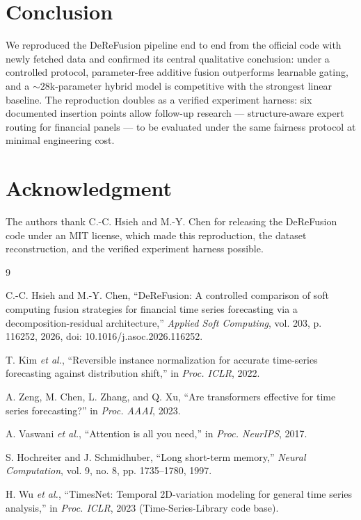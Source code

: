 \documentclass[conference]{IEEEtran}
\begin{document}
\section{Conclusion}
\label{sec:conclusion}

We reproduced the DeReFusion pipeline end to end from the official code
with newly fetched data and confirmed its central qualitative conclusion:
under a controlled protocol, parameter-free additive fusion outperforms
learnable gating, and a ${\sim}28$k-parameter hybrid model is competitive
with the strongest linear baseline. The reproduction doubles as a verified
experiment harness: six documented insertion points allow follow-up
research --- structure-aware expert routing for financial panels --- to be
evaluated under the same fairness protocol at minimal engineering cost.

\section*{Acknowledgment}

The authors thank C.-C. Hsieh and M.-Y. Chen for releasing the DeReFusion
code under an MIT license, which made this reproduction, the dataset
reconstruction, and the verified experiment harness possible.

\begin{thebibliography}{9}

C.-C. Hsieh and M.-Y. Chen,
``DeReFusion: A controlled comparison of soft computing fusion strategies
for financial time series forecasting via a decomposition-residual
architecture,'' \emph{Applied Soft Computing}, vol. 203, p. 116252, 2026,
doi: 10.1016/j.asoc.2026.116252.

T. Kim \emph{et al.}, ``Reversible instance normalization for accurate
time-series forecasting against distribution shift,'' in \emph{Proc. ICLR},
2022.

A. Zeng, M. Chen, L. Zhang, and Q. Xu, ``Are transformers effective for time
series forecasting?'' in \emph{Proc. AAAI}, 2023.

A. Vaswani \emph{et al.}, ``Attention is all you need,'' in \emph{Proc.
NeurIPS}, 2017.

S. Hochreiter and J. Schmidhuber, ``Long short-term memory,''
\emph{Neural Computation}, vol. 9, no. 8, pp. 1735--1780, 1997.

H. Wu \emph{et al.}, ``TimesNet: Temporal 2D-variation modeling for general
time series analysis,'' in \emph{Proc. ICLR}, 2023 (Time-Series-Library
code base).

\end{thebibliography}
\end{document}
